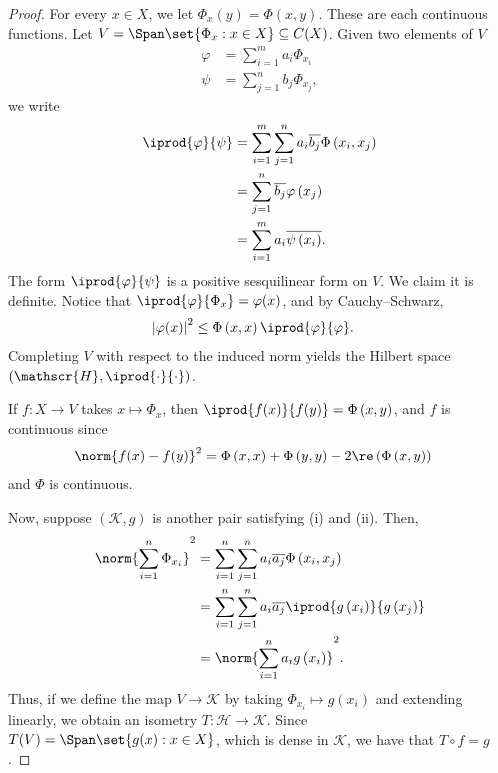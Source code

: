 \documentclass[10pt]{mypackage}
\begin{document}
\begin{proof}
  For every $x\in X$, we let $\Phi_x(y) = \Phi\left( x,y \right)$. These are each continuous functions. Let $V = \Span\set{\Phi_x : x\in X}\subseteq C(X)$. Given two elements of $V$
  \begin{align*}
    \varphi &= \sum_{i=1}^{m}a_i\Phi_{x_i}\\
    \psi &= \sum_{j=1}^{n} b_j\Phi_{x_j},
  \end{align*}
  we write
  \begin{align*}
    \iprod{\varphi}{\psi} &= \sum_{i=1}^{m}\sum_{j=1}^{n} a_i \overline{b_j}\Phi\left( x_i,x_j \right)\\
                          &= \sum_{j=1}^{n} \overline{b_j}\varphi\left( x_j \right)\\
                          &= \sum_{i=1}^{m} a_i \overline{\psi\left( x_i \right)}.
  \end{align*}
  The form $ \iprod{\varphi}{\psi} $ is a positive sesquilinear form on $V$. We claim it is definite. Notice that $ \iprod{\varphi}{\Phi_x} = \varphi(x) $, and by Cauchy--Schwarz,
  \begin{align*}
    \left\vert \varphi(x) \right\vert^2 &\leq \Phi\left( x,x \right) \iprod{\varphi}{\varphi}.
  \end{align*}
  Completing $V$ with respect to the induced norm yields the Hilbert space $ \left( \mathscr{H}, \iprod{\cdot}{\cdot} \right) $.

  If $f\colon X\to V$ takes $x\mapsto \Phi_x$, then $ \iprod{f(x)}{f(y)} = \Phi\left( x,y \right) $, and $f$ is continuous since
  \begin{align*}
    \norm{f(x)-f(y)}^2 &= \Phi\left( x,x \right) + \Phi\left( y,y \right) - 2\re\left( \Phi\left( x,y \right) \right)
  \end{align*}
  and $\Phi$ is continuous.

  Now, suppose $\left( \mathscr{K},g \right)$ is another pair satisfying (i) and (ii). Then,
  \begin{align*}
    \norm{\sum_{i=1}^{n}\Phi_{x_i}}^2 &= \sum_{i=1}^{n}\sum_{j=1}^{n} a_i \overline{a_j}\Phi\left( x_i,x_j \right)\\
                                      &= \sum_{i=1}^{n} \sum_{j=1}^{n} a_i \overline{a_j} \iprod{g\left( x_i \right)}{g\left( x_j \right)}\\
                                      &= \norm{\sum_{i=1}^{n}a_ig\left( x_i \right)}^2.
  \end{align*}
  Thus, if we define the map $V\to \mathscr{K}$ by taking $\Phi_{x_i}\mapsto g\left( x_i \right)$ and extending linearly, we obtain an isometry $T\colon \mathscr{H}\to \mathscr{K}$. Since $T(V) = \Span\set{g(x) : x\in X}$, which is dense in $ \mathscr{K} $, we have that $T\circ f = g$.
\end{proof}
\end{document}
